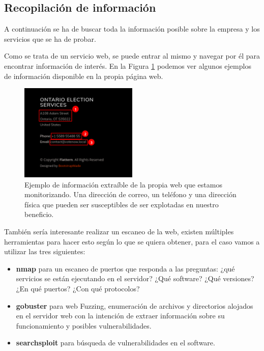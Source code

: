 \subsection{Recopilación de información}

A continuación se ha de buscar toda la información posible sobre la empresa y los servicios que se ha de probar. 

Como se trata de un servicio web, se puede entrar al mismo y navegar por él para encontrar información de interés. En la Figura \ref{info_web1} podemos ver algunos ejemplos de información disponible en la propia página web.

\begin{figure}[!hbt]
  \centering
  \includegraphics[width=0.5\textwidth]{imagenes/captura_email.png}
  \caption{Ejemplo de información extraíble de la propia web que estamos monitorizando. Una dirección de correo, un teléfono y una dirección física que pueden ser susceptibles de ser explotadas en nuestro beneficio.}
  \label{info_web1}
\end{figure}

También sería interesante realizar un escaneo de la web, existen múltiples herramientas para hacer esto según lo que se quiera obtener, para el caso vamos a utilizar las tres siguientes:

\begin{itemize}
    \item \textbf{nmap} para un escaneo de puertos que responda a las preguntas: ¿qué servicios se están ejecutando en el servidor? ¿Qué software? ¿Qué versiones? ¿En qué puertos? ¿Con qué protocolos? 
    \item \textbf{gobuster} para web \gls{Fuzzing}, enumeración de archivos y directorios alojados en el servidor web con la intención de extraer información sobre su funcionamiento y posibles vulnerabilidades.
    \item \textbf{searchsploit} para búsqueda de vulnerabilidades en el software.
\end{itemize}

